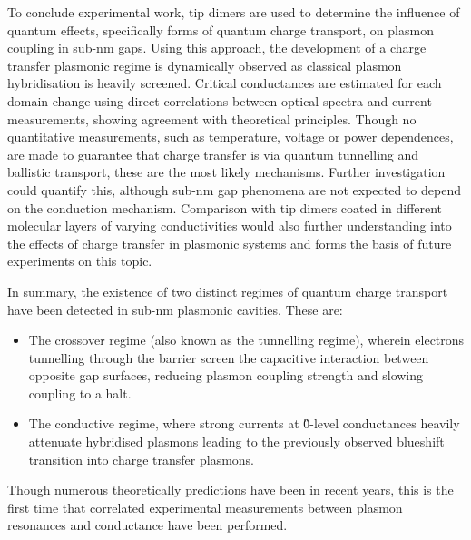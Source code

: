 \documentclass[12pt, a4paper, twoside]{book}
\begin{document}
To conclude experimental work, tip dimers are used to determine the influence of quantum effects, specifically forms of quantum charge transport, on plasmon coupling in sub-nm gaps. Using this approach, the development of a charge transfer plasmonic regime is dynamically observed as classical plasmon hybridisation is heavily screened. Critical conductances are estimated for each domain change using direct correlations between optical spectra and current measurements, showing agreement with theoretical principles. Though no quantitative measurements, such as temperature, voltage or power dependences, are made to guarantee that charge transfer is via quantum tunnelling and ballistic transport, these are the most likely mechanisms. Further investigation could quantify this, although sub-nm gap phenomena are not expected to depend on the conduction mechanism. Comparison with tip dimers coated in different molecular layers of varying conductivities would also further understanding into the effects of charge transfer in plasmonic systems and forms the basis of future experiments on this topic.

In summary, the existence of two distinct regimes of quantum charge transport have been detected in sub-nm plasmonic cavities. These are:
\begin{itemize}
\item The crossover regime (also known as the tunnelling regime), wherein electrons tunnelling through the barrier screen the capacitive interaction between opposite gap surfaces, reducing plasmon coupling strength and slowing coupling to a halt.
\item The conductive regime, where strong currents at \G0-level conductances heavily attenuate hybridised plasmons leading to the previously observed blueshift transition into charge transfer plasmons.
\end{itemize}
Though numerous theoretically predictions have been in recent years, this is the first time that correlated experimental measurements between plasmon resonances and conductance have been performed.

\ifstandalone
\begin{singlespace}
\fontsize{8pt}{1em}\selectfont
\printbibliography[notcategory=fullcited]
\end{singlespace}
\fi
\end{document}
